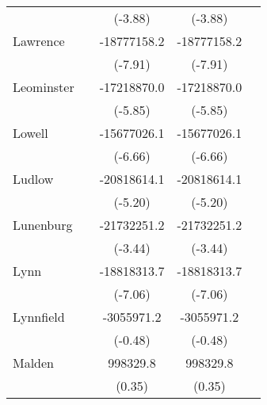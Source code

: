 {\begin{tabular}{l*{4}{c}}
                    &                     &     (-3.88)         &     (-3.88)         &                     \\
\addlinespace
Lawrence            &                     & -18777158.2\sym{***}& -18777158.2\sym{***}&                     \\
                    &                     &     (-7.91)         &     (-7.91)         &                     \\
\addlinespace
Leominster          &                     & -17218870.0\sym{***}& -17218870.0\sym{***}&                     \\
                    &                     &     (-5.85)         &     (-5.85)         &                     \\
\addlinespace
Lowell              &                     & -15677026.1\sym{***}& -15677026.1\sym{***}&                     \\
                    &                     &     (-6.66)         &     (-6.66)         &                     \\
\addlinespace
Ludlow              &                     & -20818614.1\sym{***}& -20818614.1\sym{***}&                     \\
                    &                     &     (-5.20)         &     (-5.20)         &                     \\
\addlinespace
Lunenburg           &                     & -21732251.2\sym{***}& -21732251.2\sym{***}&                     \\
                    &                     &     (-3.44)         &     (-3.44)         &                     \\
\addlinespace
Lynn                &                     & -18818313.7\sym{***}& -18818313.7\sym{***}&                     \\
                    &                     &     (-7.06)         &     (-7.06)         &                     \\
\addlinespace
Lynnfield           &                     &  -3055971.2         &  -3055971.2         &                     \\
                    &                     &     (-0.48)         &     (-0.48)         &                     \\
\addlinespace
Malden              &                     &    998329.8         &    998329.8         &                     \\
                    &                     &      (0.35)         &      (0.35)         &                     \\

\end{tabular}}
